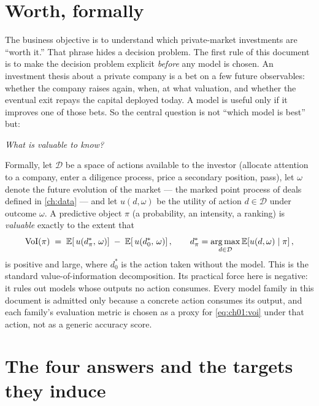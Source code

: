 
\section{Worth, formally}\label{ch01:sec:worth}

The business objective is to understand which private-market investments
are ``worth it.'' That phrase hides a decision problem. The first rule of
this document is to make the decision problem explicit \emph{before} any
model is chosen. An investment thesis about a private company is a bet on
a few future observables: whether the company raises again, when, at what
valuation, and whether the eventual exit repays the capital deployed
today. A model is useful only if it improves one of those bets. So the
central question is not ``which model is best'' but:

\begin{center}
\emph{What is valuable to know?}
\end{center}

Formally, let $\mathcal{D}$ be a space of actions available to the investor
(allocate attention to a company, enter a diligence process, price a
secondary position, pass), let $\omega$ denote the future evolution of the
market --- the marked point process of deals defined in \cref{ch:data} ---
and let $u(d,\omega)$ be the utility of action $d\in\mathcal{D}$ under
outcome $\omega$. A predictive object $\pi$ (a probability, an intensity, a
ranking) is \emph{valuable} exactly to the extent that
\begin{equation}\label{eq:ch01:voi}
\mathrm{VoI}(\pi)
 \;=\;
 \E\!\left[\, u\!\left(d^{*}_{\pi},\,\omega\right) \right]
 \;-\;
 \E\!\left[\, u\!\left(d^{*}_{0},\,\omega\right) \right],
 \qquad
 d^{*}_{\pi} = \argmax_{d\in\mathcal{D}} \E\!\left[u(d,\omega)\st \pi\right],
\end{equation}
is positive and large, where $d^{*}_{0}$ is the action taken without the
model. This is the standard value-of-information decomposition. Its
practical force here is negative: it rules out models whose outputs no
action consumes. Every model family in this document is admitted only
because a concrete action consumes its output, and each family's
evaluation metric is chosen as a proxy for \cref{eq:ch01:voi} under that
action, not as a generic accuracy score.

\section{The four answers and the targets they induce}\label{ch01:sec:targets}

